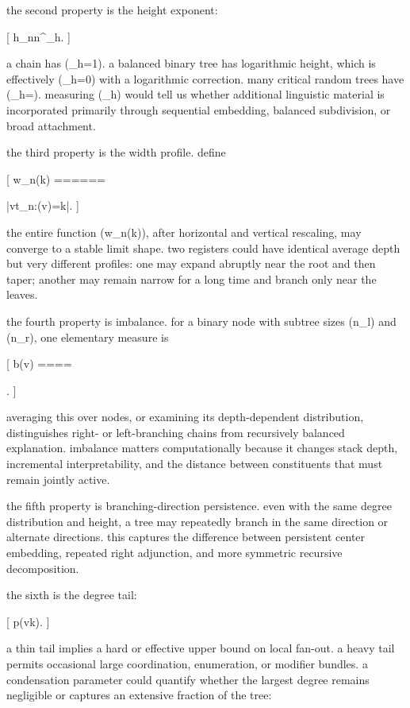 the second property is the height exponent:

[
h_n\asymp n^{\beta_h}.
]

a chain has (\beta_h=1). a balanced binary tree has logarithmic height, which is effectively (\beta_h=0) with a logarithmic correction. many critical random trees have (\beta_h=). measuring (\beta_h) would tell us whether additional linguistic material is incorporated primarily through sequential embedding, balanced subdivision, or broad attachment.

the third property is the width profile. define

[
w_n(k)
======

|{v\in t_n:(v)=k}|.
]

the entire function (w_n(k)), after horizontal and vertical rescaling, may converge to a stable limit shape. two registers could have identical average depth but very different profiles: one may expand abruptly near the root and then taper; another may remain narrow for a long time and branch only near the leaves.

the fourth property is imbalance. for a binary node with subtree sizes (n_l) and (n_r), one elementary measure is

[
b(v)
====

.
]

averaging this over nodes, or examining its depth-dependent distribution, distinguishes right- or left-branching chains from recursively balanced explanation. imbalance matters computationally because it changes stack depth, incremental interpretability, and the distance between constituents that must remain jointly active.

the fifth property is branching-direction persistence. even with the same degree distribution and height, a tree may repeatedly branch in the same direction or alternate directions. this captures the difference between persistent center embedding, repeated right adjunction, and more symmetric recursive decomposition.

the sixth is the degree tail:

[
p(\deg v\ge k).
]

a thin tail implies a hard or effective upper bound on local fan-out. a heavy tail permits occasional large coordination, enumeration, or modifier bundles. a condensation parameter could quantify whether the largest degree remains negligible or captures an extensive fraction of the tree:

